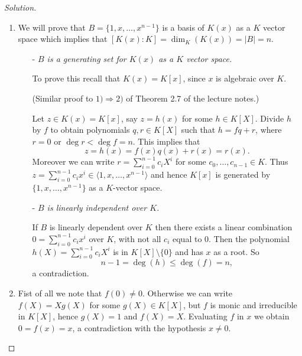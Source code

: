 \documentclass[a4paper,10pt,reqno]{amsart}
\newenvironment{sol}
  {\renewcommand\qedsymbol{$\blacksquare$}\begin{proof}[Solution]}
  {\end{proof}}
\begin{document}
\begin{sol}~
    \begin{enumerate}[label=(\roman*)]
    \item We will prove that $B=\{1,x,\dots, x^{n-1}\}$ is a basis of $K(x)$ as a $K$ vector space which implies that $[K(x):K]=\dim_K(K(x))=|B|=n$.
    \begin{itemize}
        \item[-] \textit{$B$ is a generating set for $K(x)$ as a $K$ vector space.}
        
        To prove this recall that $K(x)=K[x]$, since $x$ is algebraic over $K$.
        
        (Similar proof to $1)\Rightarrow 2)$ of Theorem 2.7 of the lecture notes.)

        Let $z\in K(x)=K[x]$, say $z=h(x)$ for some $h\in K[X]$. 
        Divide $h$ by $f$ to obtain polynomials $q,r\in K[X]$ 
        such that $h=fq+r$, where $r=0$ or $\deg r<\deg f=n$. This implies that
	\[
		z=h(x)=f(x)q(x)+r(x)=r(x).
	\]
	Moreover we can write
        $r=\sum_{i=0}^{n-1}c_iX^i$ for some $c_0,\dots,c_{n-1}\in K$. 
        Thus $z=\sum_{i=0}^{n-1}c_ix^i\in \langle 1,x,\dots,x^{n-1}\rangle$
        and hence $K[x]$ is generated by $\{1,x,\dots,x^{n-1}\}$ as a $K$-vector space.
        \item[-] \textit{$B$ is linearly independent over $K$.}

        If $B$ is linearly dependent over $K$ then there exists a linear combination 
        $0=\sum_{i=0}^{n-1}c_ix^i$ over $K$, with not all $c_i$ equal to 0.
        Then the polynomial $h(X)=\sum_{i=0}^{n-1}c_iX^i$ is in $K[X]\setminus\{0\}$
        and has $x$ as a root.
        So 
        \[
        n-1=\deg(h)\leq \deg(f)=n,
        \]
     a contradiction.    
    \end{itemize}
    \item Fist of all we note that $f(0)\neq 0$. Otherwise we can write $f(X)=Xg(X)$ for some $g(X)\in K[X]$, but $f$ is monic and irreducible in $K[X]$, hence $g(X)=1$ and $f(X)=X$.
    Evaluating $f$ in $x$ we obtain $0=f(x)=x$, a contradiction with the hypothesis $x\neq 0$.


\end{enumerate}
\end{sol}
\end{document}
